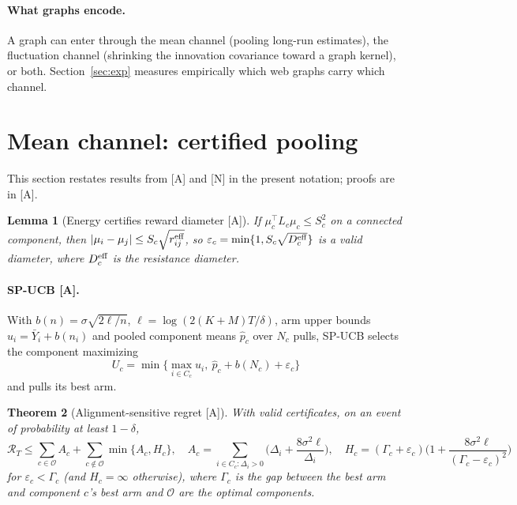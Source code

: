 \documentclass[11pt]{article}
\newtheorem{theorem}{Theorem}
\newtheorem{lemma}[theorem]{Lemma}
\theoremstyle{definition}
\theoremstyle{remark}
\newcommand{\src}[1]{\textsf{[#1]}}
\begin{document}
\paragraph{What graphs encode.} A graph can enter through the mean channel (pooling long-run estimates), the fluctuation channel (shrinking the innovation covariance toward a graph kernel), or both. Section~\ref{sec:exp} measures empirically which web graphs carry which channel.

\section{Mean channel: certified pooling}\label{sec:mean}

This section restates results from \src{A} and \src{N} in the present notation; proofs are in \src{A}.

\begin{lemma}[Energy certifies reward diameter \src{A}]\label{lem:resistance}
If $\mu_c^\top L_c\mu_c\le S_c^2$ on a connected component, then $|\mu_i-\mu_j|\le S_c\sqrt{r^{\rm eff}_{ij}}$, so $\varepsilon_c=\min\{1,S_c\sqrt{D^{\rm eff}_c}\}$ is a valid diameter, where $D^{\rm eff}_c$ is the resistance diameter.
\end{lemma}

\paragraph{SP-UCB \src{A}.} With $b(n)=\sigma\sqrt{2\ell/n}$, $\ell=\log(2(K+M)T/\delta)$, arm upper bounds $u_i=\bar Y_i+b(n_i)$ and pooled component means $\hat p_c$ over $N_c$ pulls, SP-UCB selects the component maximizing
\begin{equation}
U_c=\min\{\max_{i\in C_c}u_i,\ \hat p_c+b(N_c)+\varepsilon_c\}
\end{equation}
and pulls its best arm.

\begin{theorem}[Alignment-sensitive regret \src{A}]\label{thm:spucb}
With valid certificates, on an event of probability at least $1-\delta$,
\[
\mathcal R_T\le\sum_{c\in\mathcal O}A_c+\sum_{c\notin\mathcal O}\min\{A_c,H_c\},\quad
A_c=\sum_{i\in C_c:\Delta_i>0}\Big(\Delta_i+\frac{8\sigma^2\ell}{\Delta_i}\Big),\quad
H_c=(\Gamma_c+\varepsilon_c)\Big(1+\frac{8\sigma^2\ell}{(\Gamma_c-\varepsilon_c)^2}\Big)
\]
for $\varepsilon_c<\Gamma_c$ (and $H_c=\infty$ otherwise), where $\Gamma_c$ is the gap between the best arm and component $c$'s best arm and $\mathcal O$ are the optimal components.
\end{theorem}
\end{document}
